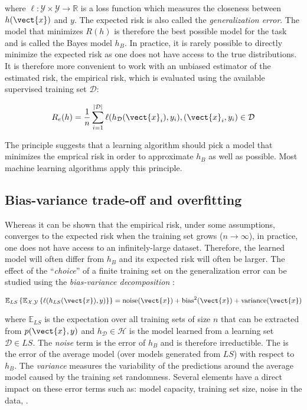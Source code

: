where $\ell: \mathcal{Y}\times\mathcal{Y} \rightarrow \mathbb{R}$ is a loss function
which measures the closeness between $h(\vect{x})$ and $y$. The expected risk is
also called the \textit{generalization error}. The model that minimizes $R(h)$ is
therefore the best possible model for the task and is called the Bayes model $h_B$.
In practice, it is rarely possible to directly minimize the expected risk as one
does not have access to the true distributions. It is therefore more convenient
to work with an unbiased estimator of the estimated risk, the empirical risk,
which is evaluated using the available supervised training set $\mathcal{D}$:

\begin{equation}
\label{eqn:backml:empiricalrisk}
R_e(h) = \frac{1}{n} \sum_{i=1}^{|\mathcal{D}|} \ell(h_\mathcal{D}(\vect{x}_i), y_i), (\vect{x}_i, y_i) \in \mathcal{D}
\end{equation}

The  principle suggests that a learning algorithm should pick a
model that minimizes the emprical risk in order to approximate $h_B$ as well as
possible. Most machine learning algorithms apply this principle.

\subsection{Bias-variance trade-off and overfitting}
\label{ssec:backml:bvtradeoff}

Whereas it can be shown that the empirical risk, under some assumptions, converges
to the expected risk when the training set grows ($n \rightarrow \infty$), in
practice, one does not have access to an infinitely-large dataset. Therefore, the
learned model will often differ from $h_B$ and its expected risk will often be
larger. The effect of the ``\textit{choice}'' of a finite training set on the
generalization error can be studied using the \textit{bias-variance decomposition}
\parencite{geman1992neural, geurts2009bias, friedman2017elements}:

\begin{equation}
\label{eqn:backml:biasvariancedec}
\mathbb{E}_{LS}\left\{\mathbb{E}_{\mathcal{X},\mathcal{Y}}\left\{ \ell(h_{LS}(\vect{x}), y)\right\}\right\} = \text{noise}(\vect{x}) + \text{bias}^2(\vect{x}) + \text{variance}(\vect{x})
\end{equation}

where $\mathbb{E}_{LS}$ is the expectation over all training sets of size $n$ that
can be extracted from $p(\vect{x},y)$ and $h_{\mathcal{D}} \in \mathcal{H}$ is
the model learned from a learning set $\mathcal{D} \in LS$. The \textit{noise}
term is the error of $h_B$ and is therefore irreductible. The  is the
error of the average model (over models generated from $LS$) with respect to $h_B$.
The \textit{variance} measures the variability of the predictions around the
average model caused by the training set randomness. Several elements have a direct
impact on these error terms such as: model capacity, training set size, noise in
the data, \etc.

